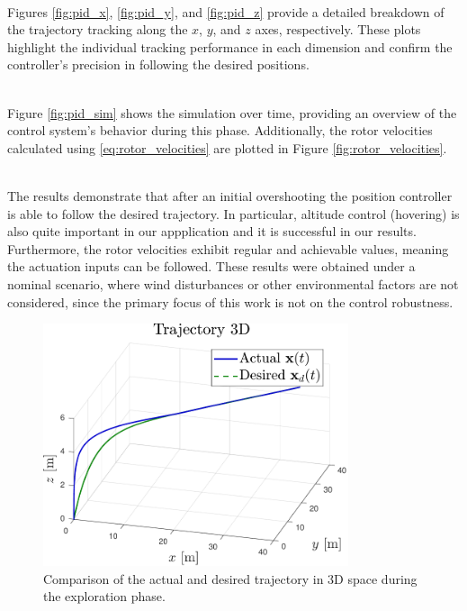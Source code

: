 \noindent\\
Figures \ref{fig:pid_x}, \ref{fig:pid_y}, and \ref{fig:pid_z}
provide a detailed breakdown of the trajectory tracking along 
the \(x\), \(y\), and \(z\) axes, respectively. 
These plots highlight the individual tracking performance 
in each dimension and confirm the controller's precision 
in following the desired positions.


\noindent\\
Figure \ref{fig:pid_sim} shows the simulation over time,
providing an overview of the control system's behavior 
during this phase. Additionally, the rotor velocities 
calculated using \eqref{eq:rotor_velocities} are plotted 
in Figure \ref{fig:rotor_velocities}. 

\noindent\\
The results demonstrate
that after an initial overshooting the position controller
is able to follow the desired trajectory.
In particular, altitude control (hovering) is also quite important in our appplication
and it is successful in our results.
Furthermore, the rotor velocities exhibit regular and achievable values,
meaning the actuation inputs can be followed.
These results were obtained under a nominal scenario, 
where wind disturbances or other environmental factors are not considered,
since the primary focus of this work is not on the control robustness.
\begin{figure}
    \centering
    \includegraphics[width=0.8\textwidth]{images/trajectory_comparison.pdf}
    \caption[3D Trajectory Tracking]{Comparison of the actual and desired trajectory in 3D space during the exploration phase.}
    \label{fig:pd_traj_comparison}
\end{figure}

